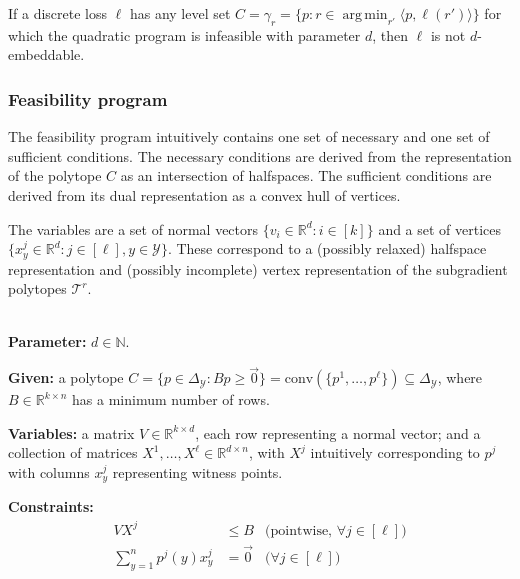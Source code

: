 \documentclass[anon]{colt2020} %
\newcommand{\reals}{\mathbb{R}}
\newcommand{\simplex}{\Delta_\Y}
\newcommand{\T}{\mathcal{T}}
\newcommand{\Y}{\mathcal{Y}}
\newcommand{\inprod}[2]{\langle #1, #2 \rangle}%
\newcommand{\conv}{\mathrm{conv}}
\DeclareMathOperator*{\argmin}{arg\,min}
\begin{document}
\begin{corollary}\label{cor:d-embeddable-char}
  If a discrete loss $\ell$ has any level set $C = \gamma_r = \{p : r \in \argmin_{r'} \inprod{p}{\ell(r')} \}$ for which the quadratic program is infeasible with parameter $d$, then $\ell$ is not $d$-embeddable.
\end{corollary}


\subsubsection{Feasibility program}

The feasibility program intuitively contains one set of necessary and one set of sufficient conditions.
The necessary conditions are derived from the representation of the polytope $C$ as an intersection of halfspaces.
The sufficient conditions are derived from its dual representation as a convex hull of vertices.

The variables are a set of normal vectors $\{v_i \in \reals^d : i \in [k]\}$ and a set of vertices $\{x^j_y \in \reals^d : j \in [\ell], y \in \Y\}$.
These correspond to a (possibly relaxed) halfspace representation and (possibly incomplete) vertex representation of the subgradient polytopes $\T^r$.

\begin{definition} \label{def:qfp} ~ \\
  \indent \textbf{Parameter:} $d \in \mathbb{N}$.

  \textbf{Given:} a polytope $C = \{p \in \simplex : Bp \geq \vec 0\} = \conv(\{p^1, \ldots, p^\ell\}) \subseteq \simplex$, where $B \in \reals^{k \times n}$ has a minimum number of rows.

  \textbf{Variables:} a matrix $V \in \reals^{k \times d}$, each row representing a normal vector; and a collection of matrices $X^1,\ldots,X^{\ell} \in \reals^{d \times n}$, with $X^j$ intuitively corresponding to $p^j$ with columns $x^j_y$ representing witness points.

  \textbf{Constraints:}
    \begin{align}
      V X^j                     &\leq B    & \text{(pointwise, $\forall j \in [\ell]$)}  \label{eqn:qp-constr-1} \\
      \sum_{y=1}^n p^j(y) x^j_y &= \vec 0  & \text{($\forall j \in [\ell]$)}    \label{eqn:qp-constr-2}
    \end{align}
\end{definition}
\end{document}
